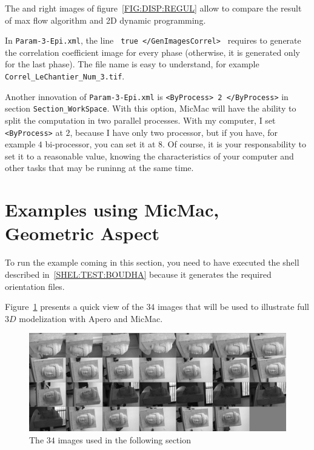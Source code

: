 The  %
 and right images of figure~\ref{FIG:DISP:REGUL}  allow to compare the result
of max flow algorithm and 2D dynamic programming.

In {\tt Param-3-Epi.xml}, the line {\tt  <GenImagesCorrel > true </GenImagesCorrel> }
requires to generate the correlation coefficient image for every phase
(otherwise, it is generated only for the last phase). The file name  is
easy to understand, for example  {\tt Correl\_LeChantier\_Num\_3.tif}.


Another innovation of {\tt Param-3-Epi.xml} is {\tt  <ByProcess> 2 </ByProcess>} in
section {\tt Section\_WorkSpace}. With this option, MicMac will have the ability
to split the computation in two parallel processes. With my computer, I set
{\tt  <ByProcess>} at $2$, because I have only two processor, but if you have,
for example $4$ bi-processor, you can set it at $8$. Of course, it is your responsability
to set it to a reasonable value, knowing the characteristics of your computer
and other tasks that may be runinng at the same time.


\section{Examples using MicMac, Geometric Aspect}

To run the example coming in this section, you need to have executed the shell 
described in~\ref{SHEL:TEST:BOUDHA}
because it generates the required orientation files.

Figure~\ref{FIG:ALL:BOUDHA} presents a quick view of the $34$
images that will be used to illustrate full $3D$ modelization
with Apero and MicMac.

\begin{figure}
\includegraphics[width=150mm]{FIGS/Boudhas/Planche.jpg}
\caption{The $34$ images used in the following section}
\label{FIG:ALL:BOUDHA}
\end{figure}

